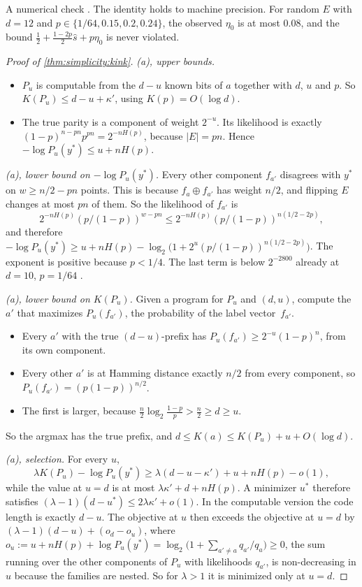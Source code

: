 A numerical check . The identity holds to machine precision. For random $E$ with $d=12$ and $p\in\{1/64,0.15,0.2,0.24\}$, the observed $\eta_0$ is at most $0.08$, and the bound $\frac12+\frac{1-2p}2\hat s+p\eta_0$ is never violated.

\begin{proof}[Proof of \cref{thm:simplicity:kink}]
\emph{(a), upper bounds.}
\begin{itemize}
\item $P_u$ is computable from the $d-u$ known bits of $a$ together with $d$, $u$ and $p$. So $K(P_u)\le d-u+\kappa'$, using $K(p)=O(\log d)$.
\item The true parity is a component of weight $2^{-u}$. Its likelihood is exactly $(1-p)^{n-pn}p^{pn}=2^{-nH(p)}$, because $|E|=pn$. Hence $-\log P_u(y^*)\le u+nH(p)$.
\end{itemize}

\emph{(a), lower bound on $-\log P_u(y^*)$.} Every other component $f_{a'}$ disagrees with $y^*$ on $w\ge n/2-pn$ points. This is because $f_a\oplus f_{a'}$ has weight $n/2$, and flipping $E$ changes at most $pn$ of them. So the likelihood of $f_{a'}$ is
\[
2^{-nH(p)}(p/(1-p))^{w-pn}\le2^{-nH(p)}(p/(1-p))^{n(1/2-2p)},
\]
and therefore $-\log P_u(y^*)\ge u+nH(p)-\log_2\big(1+2^u(p/(1-p))^{n(1/2-2p)}\big)$. The exponent is positive because $p<1/4$. The last term is below $2^{-2800}$ already at $d=10$, $p=1/64$ .

\emph{(a), lower bound on $K(P_u)$.} Given a program for $P_u$ and $(d,u)$, compute the $a'$ that maximizes $P_u(f_{a'})$, the probability of the label vector~$f_{a'}$.
\begin{itemize}
\item Every $a'$ with the true $(d-u)$-prefix has $P_u(f_{a'})\ge2^{-u}(1-p)^n$, from its own component.
\item Every other $a'$ is at Hamming distance exactly $n/2$ from every component, so $P_u(f_{a'})=(p(1-p))^{n/2}$.
\item The first is larger, because $\frac n2\log_2\frac{1-p}p>\frac n2\ge d\ge u$.
\end{itemize}
So the argmax has the true prefix, and $d\le K(a)\le K(P_u)+u+O(\log d)$.

\emph{(a), selection.} For every $u$,
\[
\lambda K(P_u)-\log P_u(y^*)\ge\lambda(d-u-\kappa')+u+nH(p)-o(1),
\]
while the value at $u=d$ is at most $\lambda\kappa'+d+nH(p)$. A minimizer $u^*$ therefore satisfies $(\lambda-1)(d-u^*)\le2\lambda\kappa'+o(1)$. In the computable version the code length is exactly $d-u$. The objective at $u$ then exceeds the objective at $u=d$ by $(\lambda-1)(d-u)+(o_d-o_u)$, where $o_u:=u+nH(p)+\log P_u(y^*)=\log_2\big(1+\sum_{a'\neq a}q_{a'}/q_a\big)\ge0$, the sum running over the other components of $P_u$ with likelihoods $q_{a'}$, is non-decreasing in $u$ because the families are nested. So for $\lambda>1$ it is minimized only at $u=d$.


\end{proof}
